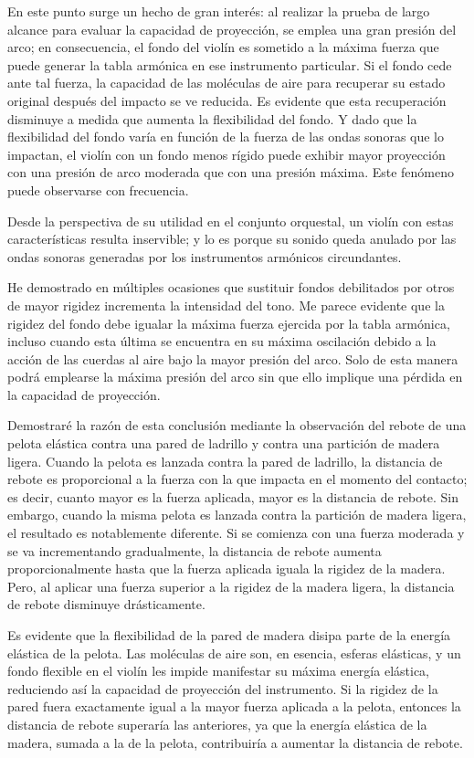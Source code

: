 \documentclass[12pt]{book}
\begin{document}
En este punto surge un hecho de gran interés: al realizar la prueba de largo alcance para evaluar la capacidad de proyección, se emplea una gran presión del arco; en consecuencia, el fondo del violín es sometido a la máxima fuerza que puede generar la tabla armónica en ese instrumento particular. Si el fondo cede ante tal fuerza, la capacidad de las moléculas de aire para recuperar su estado original después del impacto se ve reducida. Es evidente que esta recuperación disminuye a medida que aumenta la flexibilidad del fondo. Y dado que la flexibilidad del fondo varía en función de la fuerza de las ondas sonoras que lo impactan, el violín con un fondo menos rígido puede exhibir mayor proyección con una presión de arco moderada que con una presión máxima. Este fenómeno puede observarse con frecuencia.

Desde la perspectiva de su utilidad en el conjunto orquestal, un violín con estas características resulta inservible; y lo es porque su sonido queda anulado por las ondas sonoras generadas por los instrumentos armónicos circundantes. 

He demostrado en múltiples ocasiones que sustituir fondos debilitados por otros de mayor rigidez incrementa la intensidad del tono. Me parece evidente que la rigidez del fondo debe igualar la máxima fuerza ejercida por la tabla armónica, incluso cuando esta última se encuentra en su máxima oscilación debido a la acción de las cuerdas al aire bajo la mayor presión del arco. Solo de esta manera podrá emplearse la máxima presión del arco sin que ello implique una pérdida en la capacidad de proyección.

Demostraré la razón de esta conclusión mediante la observación del rebote de una pelota elástica contra una pared de ladrillo y contra una partición de madera ligera. Cuando la pelota es lanzada contra la pared de ladrillo, la distancia de rebote es proporcional a la fuerza con la que impacta en el momento del contacto; es decir, cuanto mayor es la fuerza aplicada, mayor es la distancia de rebote. Sin embargo, cuando la misma pelota es lanzada contra la partición de madera ligera, el resultado es notablemente diferente. Si se comienza con una fuerza moderada y se va incrementando gradualmente, la distancia de rebote aumenta proporcionalmente hasta que la fuerza aplicada iguala la rigidez de la madera. Pero, al aplicar una fuerza superior a la rigidez de la madera ligera, la distancia de rebote disminuye drásticamente. 

Es evidente que la flexibilidad de la pared de madera disipa parte de la energía elástica de la pelota. Las moléculas de aire son, en esencia, esferas elásticas, y un fondo flexible en el violín les impide manifestar su máxima energía elástica, reduciendo así la capacidad de proyección del instrumento. Si la rigidez de la pared fuera exactamente igual a la mayor fuerza aplicada a la pelota, entonces la distancia de rebote superaría las anteriores, ya que la energía elástica de la madera, sumada a la de la pelota, contribuiría a aumentar la distancia de rebote. 
\end{document}

